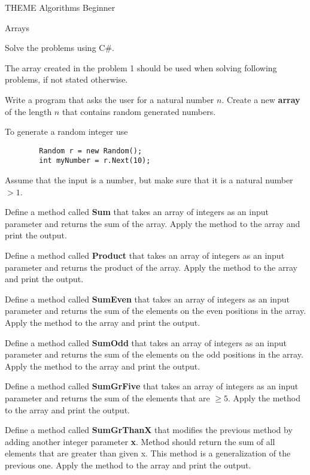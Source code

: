\documentclass{exam}
\newcommand{\bfemph}[1]{\textbf{#1}}
\renewcommand{\emph}[1]{\bfemph{#1}}
\begin{document}
\normalsize
\textsf{THEME} \large Algorithms
\hfill
Beginner

\noindent\makebox[\linewidth]{\rule{\paperwidth}{0.4pt}}

\bigskip
\huge
\noindent
\textsf{Arrays}

\bigskip

\Large
\noindent
Solve the problems using C\#.

\bigskip

\noindent
The array created in the problem 1 should be used when solving following problems, if not stated otherwise. 

\vspace{5mm}

\large
\begin{questions}
    \question Write a program that asks the user for a natural number $n$. 
    Create a new \emph{array} of the length $n$ that contains random generated numbers.
    
    To generate a random integer use
    \begin{verbatim}
        Random r = new Random();
        int myNumber = r.Next(10);
    \end{verbatim}
    Assume that the input is a number, but make sure that it is a natural number $> 1$.

    \question Define a method called \emph{Sum} that takes an array of integers as an input parameter
    and returns the sum of the array. Apply the method to the array and print the output.

    \question Define a method called \emph{Product} that takes an array of integers as an input parameter
    and returns the product of the array. Apply the method to the array and print the output.

    \question Define a method called \emph{SumEven} that takes an array of integers as an input parameter
    and returns the sum of the elements on the even positions in the array. Apply the method to the array and print the output.

    \question Define a method called \emph{SumOdd} that takes an array of integers as an input parameter
    and returns the sum of the elements on the odd positions in the array. Apply the method to the array and print the output.

    \question Define a method called \emph{SumGrFive} that takes an array of integers as an input parameter
    and returns the sum of the elements that are $\geq 5$. Apply the method to the array and print the output.

    \question Define a method called \emph{SumGrThanX} that modifies the previous method by adding another integer parameter \emph{x}. 
    Method should return the sum of all elements that are greater than given x. This method is a generalization of the
    previous one. Apply the method to the array and print the output.

\end{questions}
\end{document}
